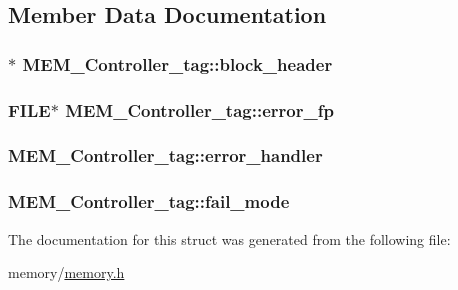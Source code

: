 \subsection{Member Data Documentation}
\hypertarget{struct_m_e_m___controller__tag_a8cdf922b2df14ad5c169e8719d47e8fb}{}
\subsubsection[{block\+\_\+header}]{$\ast$ M\+E\+M\+\_\+\+Controller\+\_\+tag\+::block\+\_\+header}\label{struct_m_e_m___controller__tag_a8cdf922b2df14ad5c169e8719d47e8fb}
\hypertarget{struct_m_e_m___controller__tag_a574de58b2a1928a04e5e7a7cbb1c2e37}{}
\subsubsection[{error\+\_\+fp}]{\setlength{\rightskip}{0pt plus 5cm}F\+I\+L\+E$\ast$ M\+E\+M\+\_\+\+Controller\+\_\+tag\+::error\+\_\+fp}\label{struct_m_e_m___controller__tag_a574de58b2a1928a04e5e7a7cbb1c2e37}
\hypertarget{struct_m_e_m___controller__tag_a8e66791a8c41fabb661c122942150dab}{}
\subsubsection[{error\+\_\+handler}]{ M\+E\+M\+\_\+\+Controller\+\_\+tag\+::error\+\_\+handler}\label{struct_m_e_m___controller__tag_a8e66791a8c41fabb661c122942150dab}
\hypertarget{struct_m_e_m___controller__tag_ac3d980809419cb5d423a4bcf8022d0c8}{}
\subsubsection[{fail\+\_\+mode}]{ M\+E\+M\+\_\+\+Controller\+\_\+tag\+::fail\+\_\+mode}\label{struct_m_e_m___controller__tag_ac3d980809419cb5d423a4bcf8022d0c8}


The documentation for this struct was generated from the following file\+:\begin{DoxyCompactItemize}
\item 
memory/\hyperlink{memory_8h}{memory.\+h}\end{DoxyCompactItemize}
